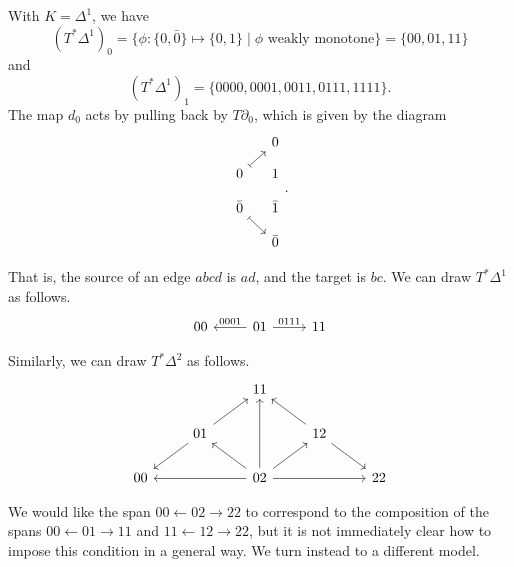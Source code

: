\documentclass[main.tex]{subfiles}
\begin{document}
\begin{example}
  With $K = \Delta^{1}$, we have
  \begin{equation*}
    (T^{*}\Delta^{1})_{0} = \{\phi\colon \{0, \bar{0}\} \mapsto \{0, 1\} \mid \phi \text{ weakly monotone}\} = \{00, 01, 11\}
  \end{equation*}
  and
  \begin{equation*}
    (T^{*}\Delta^{1})_{1} = \{0000, 0001, 0011, 0111, 1111\}.
  \end{equation*}
  The map $d_{0}$ acts by pulling back by $T\partial_{0}$, which is given by the diagram
  \begin{equation*}
    \begin{tikzcd}[row sep=small, column sep=small]
      & 0
      \\
      0
      \arrow[ur, mapsto]
      & 1
      \\
      \bar{0}
      \arrow[dr, mapsto]
      & \bar{1}
      \\
      & \bar{0}
    \end{tikzcd}.
  \end{equation*}

  That is, the source of an edge $abcd$ is $ad$, and the target is $bc$. We can draw $T^{*}\Delta^{1}$ as follows.
  \begin{equation*}
    \begin{tikzcd}
      00
      & 01
      \arrow[l, swap, "0001"]
      \arrow[r, "0111"]
      & 11
    \end{tikzcd}
  \end{equation*}

  Similarly, we can draw $T^{*}\Delta^{2}$ as follows.
  \begin{equation*}
    \begin{tikzcd}
      && 11
      \\
      & 01
      \arrow[ur]
      \arrow[dl]
      && 12
      \arrow[ul]
      \arrow[dr]
      \\
      00
      && 02
      \arrow[ll]
      \arrow[rr]
      \arrow[uu]
      \arrow[ur]
      \arrow[ul]
      && 22
    \end{tikzcd}
  \end{equation*}

  We would like the span $00 \leftarrow 02 \rightarrow 22$ to correspond to the composition of the spans $00 \leftarrow 01 \rightarrow 11$ and $11 \leftarrow 12 \rightarrow 22$, but it is not immediately clear how to impose this condition in a general way. We turn instead to a different model.
\end{example}
\end{document}
